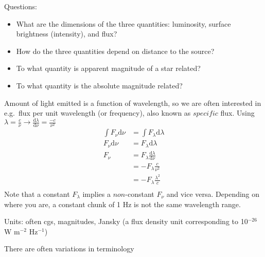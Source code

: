 \documentclass[12pt]{article}
\begin{document}
Questions:
\begin{itemize}
    \item What are the dimensions of the three quantities: luminosity,
        surface brightness (intensity), and flux?
    \item How do the three quantities depend on distance to the source?
    \item To what quantity is apparent magnitude of a star related?
    \item To what quantity is the absolute magnitude related?
\end{itemize}
Amount of light emitted is a function of wavelength, so we are often interested
in e.g.\ flux per unit wavelength (or frequency), also known as $specific$
flux. Using $\lambda=\frac{c}{\nu} \rightarrow
\frac{\textrm{d}\lambda}{\textrm{d}\nu} = \frac{-c}{\nu^2}$
\begin{align*}
    \int F_{\nu} \textrm{d} \nu &= \int F_{\lambda} \textrm{d} \lambda\\
    F_{\nu} \textrm{d} \nu &= F_{\lambda} \textrm{d} \lambda\\
    F_{\nu} &= F_{\lambda} \frac{\textrm{d} \lambda}{\textrm{d}\nu}\\
    &= -F_{\lambda} \frac{c}{\nu^2}\\
    &= -F_{\lambda} \frac{\lambda^2}{c}\\
\end{align*}
Note that a constant $F_{\lambda}$ implies a $non$-constant $F_{\nu}$
and vice versa. Depending on where you are, a constant chunk of 1 Hz is
not the same wavelength range.

Units: often cgs, magnitudes, Jansky (a flux density unit
corresponding to 10$^{-26}$ W m$^{-2}$ Hz$^{-1}$)

There are often variations in terminology
\end{document}
